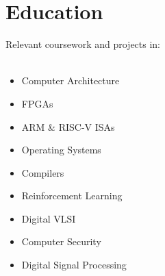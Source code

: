 \documentclass{moderncv}
\begin{document}

\section{Education}
{
    Relevant coursework and projects in:\\
    \\
\begin{minipage}{0.3\textwidth}
\begin{itemize}
    \item Computer Architecture
    \item FPGAs
    \item ARM \& RISC-V ISAs
\end{itemize}
\end{minipage}
\begin{minipage}{0.3\textwidth}
\begin{itemize}
    \item Operating Systems
    \item Compilers
    \item Reinforcement Learning
\end{itemize}
\end{minipage}
\begin{minipage}{0.3\textwidth}
\begin{itemize}
    \item Digital VLSI
    \item Computer Security
    \item Digital Signal Processing
\end{itemize}
\end{minipage}
}
\end{document}
